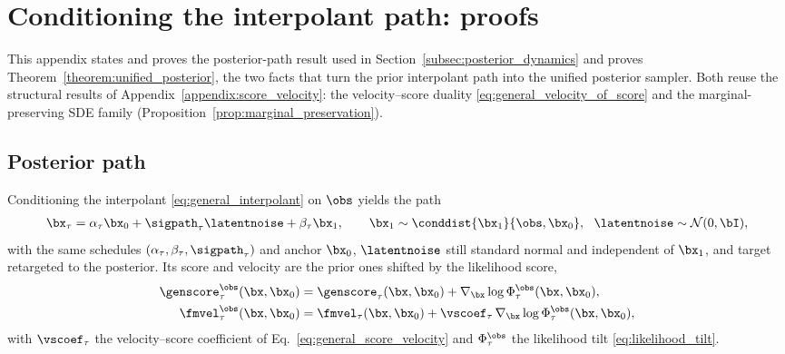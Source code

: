 
\section{Conditioning the interpolant path: proofs}
\label{appendix:proof_conditioning}

This appendix states and proves the posterior-path result used in Section~\ref{subsec:posterior_dynamics} and proves Theorem~\ref{theorem:unified_posterior}, the two facts that turn the prior interpolant path into the unified posterior sampler. Both reuse the structural results of Appendix~\ref{appendix:score_velocity}: the velocity--score duality \eqref{eq:general_velocity_of_score} and the marginal-preserving SDE family (Proposition~\ref{prop:marginal_preservation}).

\subsection{Posterior path}

\begin{proposition}\label{prop:conditional_path}
Conditioning the interpolant \eqref{eq:general_interpolant} on $\obs$ yields the path
\begin{align}\label{eq:conditional_path}
    \bx_\tau = \alpha_\tau\bx_0 + \sigpath_\tau\latentnoise + \beta_\tau\bx_1,
    \qquad \bx_1\sim\conddist{\bx_1}{\obs,\bx_0},\ \ \latentnoise\sim\mathcal{N}(0,\bI),
\end{align}
with the same schedules $(\alpha_\tau,\beta_\tau,\sigpath_\tau)$ and anchor $\bx_0$, $\latentnoise$ still standard normal and independent of $\bx_1$, and target retargeted to the posterior. Its score and velocity are the prior ones shifted by the likelihood score,
\begin{align}
    \genscore_\tau^{\obs}(\bx,\bx_0)
    &= \genscore_\tau(\bx,\bx_0) + \nabla_{\bx}\log\Phi_\tau^{\obs}(\bx,\bx_0),
       \label{eq:conditional_score}\\
    \fmvel_\tau^{\obs}(\bx,\bx_0)
    &= \fmvel_\tau(\bx,\bx_0) + \vscoef_\tau\,\nabla_{\bx}\log\Phi_\tau^{\obs}(\bx,\bx_0),
       \label{eq:conditional_velocity}
\end{align}
with $\vscoef_\tau$ the velocity--score coefficient of Eq.~\eqref{eq:general_score_velocity} and $\Phi_\tau^{\obs}$ the likelihood tilt \eqref{eq:likelihood_tilt}.
\end{proposition}

